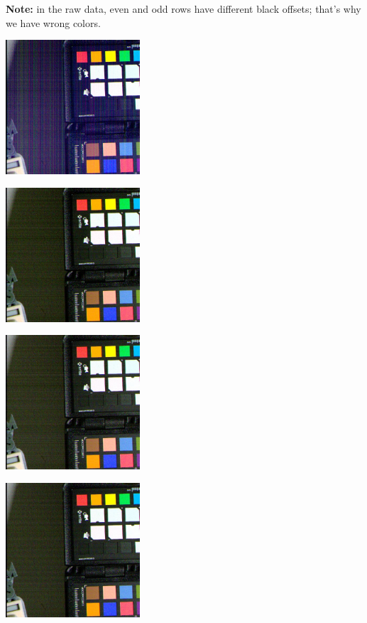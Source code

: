 {\textbf{Note:} in the raw data, even and odd rows have different black offsets; that's why we have wrong colors. \\

\begin{center}
\includegraphics[height=5cm]{images/10ms+4-totally-raw-crop}
\end{center}

\begin{center}
\includegraphics[height=5cm]{images/10ms+4-no-blackcol-crop}
\end{center}

\begin{center}
\includegraphics[height=5cm]{images/10ms+4-darkcurrent-no-blackcol-crop}
\end{center}

\begin{center}
\includegraphics[height=5cm]{images/10ms+4-darkcurrent-crop}
\end{center}


}
